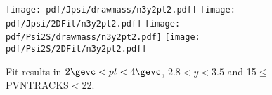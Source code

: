 \begin{figure}[H]
\begin{center}
\texttt{[image: pdf/Jpsi/drawmass/n3y2pt2.pdf]}
\texttt{[image: pdf/Jpsi/2DFit/n3y2pt2.pdf]}
\vspace*{-0.5cm}
\texttt{[image: pdf/Psi2S/drawmass/n3y2pt2.pdf]}
\texttt{[image: pdf/Psi2S/2DFit/n3y2pt2.pdf]}
\vspace*{-0.5cm}
\end{center}
\caption{Fit results in $2\gevc<pt<4\gevc$, $2.8<y<3.5$ and 15$\leq$PVNTRACKS$<$22.}
\label{Fitn3y2pt2}
\end{figure}
